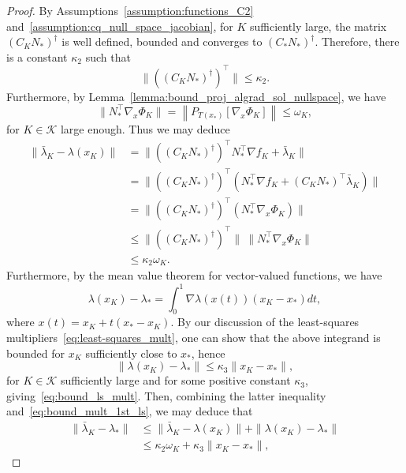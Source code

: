 \documentclass{article}
\numberwithin{equation}{section}
\newcommand{\calK}{{\mathcal{K}}}
\newcommand{\proj}[2]{P_{#1} \left[ {#2} \right]} %
\theoremstyle{plain}
\begin{document}
	\begin{proof}
		By Assumptions~\ref{assumption:functions_C2} and~\ref{assumption:cq_null_space_jacobian}, for $K$ sufficiently large, the matrix $\left(C_KN_*\right)^\dagger$ is well defined, bounded and converges to $\left(C_*N_*\right)^\dagger$. Therefore, there is a constant $\kappa_2$ such that
		\begin{equation*}
			\|(\left(C_KN_*\right)^\dagger)^\top \| \le \kappa_2.
		\end{equation*}
		Furthermore, by Lemma~\ref{lemma:bound_proj_algrad_sol_nullspace}, we have
		\[ \|N_*^\top \nabla_x\Phi_K\| = \left\| \proj{T(x_*)}{\nabla_x \Phi_K} \right\| \le  \omega_K,\]
		for $K \in \calK$ large enough. Thus we may deduce
		\begin{equation}\label{eq:bound_mult_1st_ls}
			\begin{split}
				\|\bar \lambda_K - \lambda(x_K) \| & = \|(\left(C_KN_*\right)^\dagger)^\top N_*^\top\nabla f_K + \bar\lambda_K\| \\
				& = \|(\left(C_KN_*\right)^\dagger)^\top (N_*^\top\nabla f_K + (C_KN_*)^\top\bar\lambda_K)\| \\
				& = \|((C_KN_*)^\dagger)^\top (N_*^\top  \nabla_x \Phi_K)\| \\
				& \le 	\|(\left(C_KN_*\right)^\dagger)^\top \| \ \|N_*^\top \nabla_x\Phi_K\| \\
				& \le \kappa_2 \omega_K.
			\end{split}
		\end{equation}
		Furthermore, by the mean value theorem for vector-valued functions, we have
		\[\lambda(x_K) - \lambda_* = \int_{0}^{1} \nabla \lambda(x(t))(x_K-x_*)dt,\]
		where $x(t) = x_K + t(x_*-x_K)$. By our discussion of the least-squares multipliers~\eqref{eq:least-squares_mult}, one can show that the above integrand is bounded for $x_K$ sufficiently close to $x_*$, hence
		\[\| \lambda(x_K) - \lambda_*\| \le \kappa_3 \|x_K-x_*\|,\]
		for $K\in \calK$ sufficiently large and for some positive constant $\kappa_3$, giving~\eqref{eq:bound_ls_mult}.
		Then, combining the latter inequality and~\eqref{eq:bound_mult_1st_ls}, we may deduce that
		\begin{equation*}
			\begin{split}
				\|\bar \lambda_K - \lambda_* \| & \le \|\bar \lambda_K - \lambda(x_K) \| + \|\lambda(x_K) - \lambda_* \| \\
				& \le \kappa_2 \omega_K + \kappa_3 \|x_K-x_*\|,
			\end{split}
		\end{equation*}

\end{proof}
\end{document}
